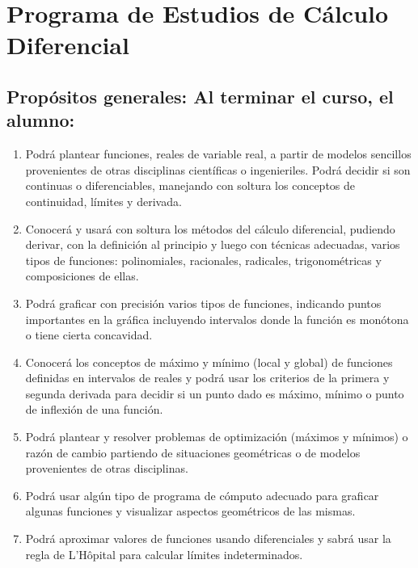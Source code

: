 \documentclass[]{book}
\begin{document}
\newpage

\thispagestyle{empty}

\printindex

\newpage

\chapter*{Programa de Estudios de Cálculo Diferencial}

\section*{Propósitos generales: Al terminar el curso, el alumno:}

\begin{enumerate}
\def\labelenumi{\arabic{enumi}.}
\item
  Podrá plantear funciones, reales de variable real, a partir de modelos
  sencillos provenientes de otras disciplinas científicas o
  ingenieriles. Podrá decidir si son continuas o diferenciables,
  manejando con soltura los conceptos de continuidad, límites y
  derivada.
\item
  Conocerá y usará con soltura los métodos del cálculo diferencial,
  pudiendo derivar, con la definición al principio y luego con técnicas
  adecuadas, varios tipos de funciones: polinomiales, racionales,
  radicales, trigonométricas y composiciones de ellas.
\item
  Podrá graficar con precisión varios tipos de funciones, indicando
  puntos importantes en la gráfica incluyendo intervalos donde la
  función es monótona o tiene cierta concavidad.
\item
  Conocerá los conceptos de máximo y mínimo (local y global) de
  funciones definidas en intervalos de reales y podrá usar los criterios
  de la primera y segunda derivada para decidir si un punto dado es
  máximo, mínimo o punto de inflexión de una función.
\item
  Podrá plantear y resolver problemas de optimización (máximos y
  mínimos) o razón de cambio partiendo de situaciones geométricas o de
  modelos provenientes de otras disciplinas.
\item
  Podrá usar algún tipo de programa de cómputo adecuado para graficar
  algunas funciones y visualizar aspectos geométricos de las mismas.
\item
  Podrá aproximar valores de funciones usando diferenciales y sabrá usar
  la regla de L'Hôpital para calcular límites indeterminados.
\end{enumerate}
\end{document}
